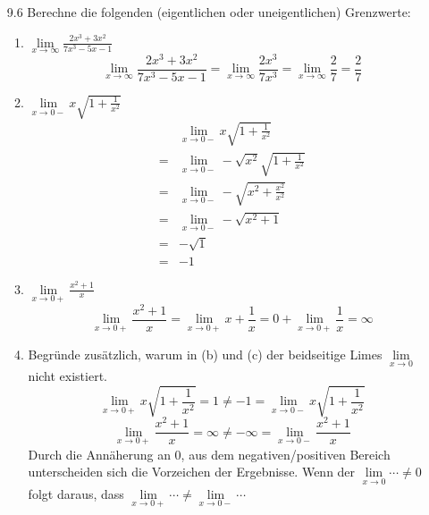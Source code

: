 \documentclass{HM}
\begin{document}
\begin{enumerate}
\item[9.6] Berechne die folgenden (eigentlichen oder uneigentlichen) Grenzwerte:
\begin{enumerate}
	\item $\lim\limits_{x\to\infty} \frac{2x^3+3x^2}{7x^3-5x-1}$
	$$\lim\limits_{x\to\infty} \frac{2x^3+3x^2}{7x^3-5x-1}=\lim\limits_{x\to\infty} \frac{2x^3}{7x^3}=\lim\limits_{x\to\infty} \frac{2}{7}=\frac{2}{7}$$
	\item $\lim\limits_{x\to0-} x\sqrt{1+\frac{1}{x^2}}$
	\begin{align*}
		&\lim\limits_{x\to0-} x\sqrt{1+\frac{1}{x^2}}\\
		=&\lim\limits_{x\to0-} -\sqrt{x^2}\sqrt{1+\frac{1}{x^2}}\\
		=&\lim\limits_{x\to0-} -\sqrt{x^2+\frac{x^2}{x^2}}\\
		=&\lim\limits_{x\to0-} -\sqrt{x^2+1}\\
		=& -\sqrt{1}\\
		=& -1
	\end{align*}
	\item $\lim\limits_{x\to0+}\frac{x^2+1}{x}$
	$$\lim\limits_{x\to0+}\frac{x^2+1}{x}
	=\lim\limits_{x\to0+}x+\frac{1}{x}
	=0+\lim\limits_{x\to0+}\frac{1}{x}
	=\infty$$
	
	\item Begründe zusätzlich, warum in (b) und (c) der beidseitige Limes $\lim\limits_{x\to0}$ nicht existiert.
	$$\lim\limits_{x\to0+}x\sqrt{1+\frac{1}{x^2}} = 1\not= -1 = \lim\limits_{x\to0-}x\sqrt{1+\frac{1}{x^2}}$$
	$$\lim\limits_{x\to0+}\frac{x^2+1}{x} = \infty\not= -\infty = \lim\limits_{x\to0-}\frac{x^2+1}{x}$$
	Durch die Annäherung an 0, aus dem negativen/positiven Bereich unterscheiden sich die Vorzeichen der Ergebnisse. Wenn der $\lim\limits_{x\to0}\cdots\not=0$ folgt daraus, dass $\lim\limits_{x\to0+}\cdots\not=\lim\limits_{x\to0-}\cdots$
\end{enumerate}
\end{enumerate}
\end{document}

